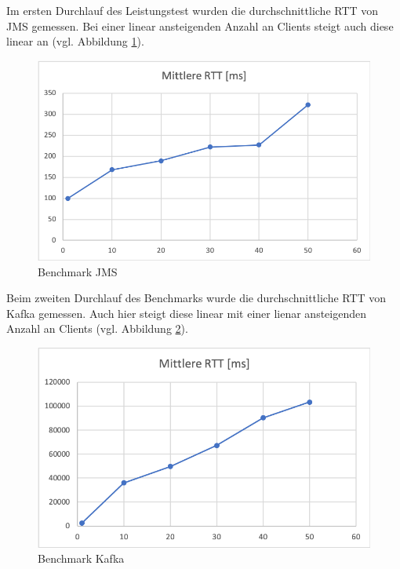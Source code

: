 \documentclass[10pt,journal,compsoc]{IEEEtran}
\begin{document}
Im ersten Durchlauf des Leistungstest wurden die durchschnittliche RTT von JMS gemessen. Bei einer linear ansteigenden Anzahl an Clients steigt auch diese linear an (vgl. Abbildung \ref{fig:RTT_JMS}).
\\

\begin{figure}[h]
	\centering
	\includegraphics[scale=0.5]{Bilder/RTT_JMS.PNG}
	\caption{Benchmark JMS}
	\label{fig:RTT_JMS}
\end{figure}


Beim zweiten Durchlauf des Benchmarks wurde die durchschnittliche RTT von Kafka gemessen. Auch hier steigt diese linear mit einer lienar ansteigenden Anzahl an Clients (vgl. Abbildung \ref{fig:RTT_Kafka}). 
\\

\begin{figure}[h]
	\centering
	\includegraphics[scale=0.5]{Bilder/RTT_Kafka.PNG}
	\caption{Benchmark Kafka}
	\label{fig:RTT_Kafka}
\end{figure}
\end{document}
